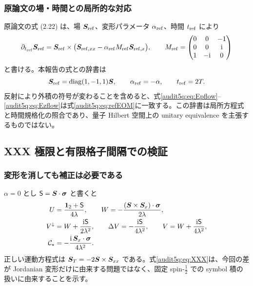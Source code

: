 \subsubsection{原論文の場・時間との局所的な対応}

原論文の式 (2.22) は、場 $\bm S_{\rm ref}$、変形パラメータ $\alpha_{\rm ref}$、時間 $t_{\rm ref}$ により\cite{DFN}
\begin{equation}
\partial_{t_{\rm ref}}\bm S_{\rm ref}
=\bm S_{\rm ref}\times\bigl(\bm S_{{\rm ref},xx}
-\alpha_{\rm ref}M_{\rm ref}\bm S_{{\rm ref},x}\bigr),\qquad
M_{\rm ref}=\begin{pmatrix}0&0&-1\\0&0&\mathrm i\\1&-\mathrm i&0\end{pmatrix}
\label{audit5q:eq:refEOM}
\end{equation}
と書ける。本報告の式との辞書は
\begin{equation}
\bm S_{\rm ref}=\operatorname{diag}(1,-1,1)\boldsymbol S,\qquad
\alpha_{\rm ref}=-\alpha,\qquad t_{\rm ref}=2T.
\label{audit5q:eq:dictionary}
\end{equation}
反射により外積の符号が変わることを含めると、式\eqref{audit5q:eq:Epflow}--\eqref{audit5q:eq:Ezflow}は式\eqref{audit5q:eq:refEOM}に一致する。この辞書は局所方程式と時間規格化の照合であり、量子 Hilbert 空間上の unitary equivalence を主張するものではない。

\subsection{XXX 極限と有限格子間隔での検証}
\subsubsection{変形を消しても補正は必要である}

$\alpha=0$ とし $\mathsf S=\boldsymbol S\cdot\bm\sigma$ と書くと
\begin{align}
U&=\frac{\mathbf 1_2+\mathsf S}{4\lambda},\qquad
W=-\frac{(\boldsymbol S\times\boldsymbol S_x)\cdot\bm\sigma}{2\lambda},\\
V^{\downarrow}&=W+\frac{\mathrm i\mathsf S}{2\lambda^2},\qquad
\Delta V=-\frac{\mathrm i\mathsf S}{4\lambda^2},\qquad
V=W+\frac{\mathrm i\mathsf S}{4\lambda^2},\label{audit5q:eq:XXX}\\
\mathcal C_{\star}&=-\frac{\mathrm i\,\boldsymbol S_x\cdot\bm\sigma}{4\lambda^2}.
\end{align}
正しい運動方程式は $\boldsymbol S_T=-2\boldsymbol S\times\boldsymbol S_{xx}$ である。式\eqref{audit5q:eq:XXX}は、今回の差が Jordanian 変形だけに由来する問題ではなく、固定 spin-$\tfrac12$ での symbol 積の扱いに由来することを示す。

